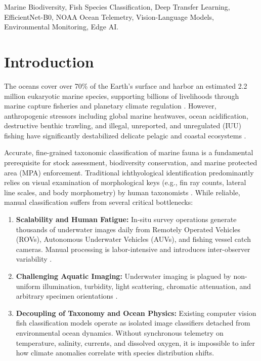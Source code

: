 \documentclass[conference]{IEEEtran}
\begin{document}
\begin{IEEEkeywords}
Marine Biodiversity, Fish Species Classification, Deep Transfer Learning, EfficientNet-B0, NOAA Ocean Telemetry, Vision-Language Models, Environmental Monitoring, Edge AI.
\end{IEEEkeywords}

\section{Introduction}
The oceans cover over 70\% of the Earth's surface and harbor an estimated 2.2 million eukaryotic marine species, supporting billions of livelihoods through marine capture fisheries and planetary climate regulation \cite{mora2011}. However, anthropogenic stressors including global marine heatwaves, ocean acidification, destructive benthic trawling, and illegal, unreported, and unregulated (IUU) fishing have significantly destabilized delicate pelagic and coastal ecosystems \cite{fao2024}.

Accurate, fine-grained taxonomic classification of marine fauna is a fundamental prerequisite for stock assessment, biodiversity conservation, and marine protected area (MPA) enforcement. Traditional ichthyological identification predominantly relies on visual examination of morphological keys (e.g., fin ray counts, lateral line scales, and body morphometry) by human taxonomists \cite{nelson2016}. While reliable, manual classification suffers from several critical bottlenecks:
\begin{enumerate}
    \item \textbf{Scalability and Human Fatigue:} In-situ survey operations generate thousands of underwater images daily from Remotely Operated Vehicles (ROVs), Autonomous Underwater Vehicles (AUVs), and fishing vessel catch cameras. Manual processing is labor-intensive and introduces inter-observer variability \cite{mallet2021}.
    \item \textbf{Challenging Aquatic Imaging:} Underwater imaging is plagued by non-uniform illumination, turbidity, light scattering, chromatic attenuation, and arbitrary specimen orientations \cite{huang2022}.
    \item \textbf{Decoupling of Taxonomy and Ocean Physics:} Existing computer vision fish classification models operate as isolated image classifiers detached from environmental ocean dynamics. Without synchronous telemetry on temperature, salinity, currents, and dissolved oxygen, it is impossible to infer how climate anomalies correlate with species distribution shifts.
\end{enumerate}
\end{document}
